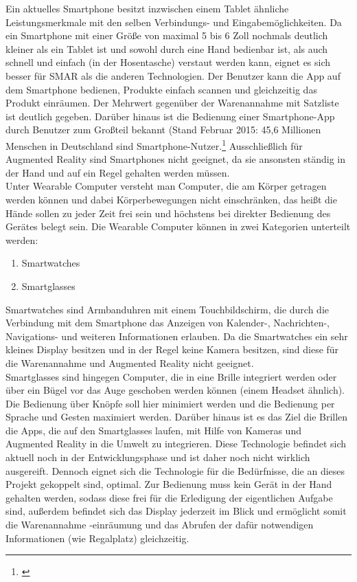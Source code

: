 Ein aktuelles Smartphone besitzt inzwischen einem Tablet ähnliche Leistungsmerkmale mit den selben Verbindungs- und Eingabemöglichkeiten. Da ein Smartphone mit einer Größe von maximal 5 bis 6 Zoll nochmals deutlich kleiner als ein Tablet ist und sowohl durch eine Hand bedienbar ist, als auch schnell und einfach (\zB in der Hosentasche) verstaut werden kann, eignet es sich besser für \ac{SMAR} als die anderen Technologien. Der Benutzer kann die App auf dem Smartphone bedienen, Produkte einfach scannen und gleichzeitig das Produkt einräumen. Der Mehrwert gegenüber der Warenannahme mit Satzliste ist deutlich gegeben. Darüber hinaus ist die Bedienung einer Smartphone-App durch Benutzer zum Großteil bekannt (Stand Februar 2015: 45,6 Millionen Menschen in Deutschland sind Smartphone-Nutzer.\footnote{\citep{statista_smartphone}} Ausschließlich für Augmented Reality sind Smartphones nicht geeignet, da sie ansonsten ständig in der Hand und auf ein Regel gehalten werden müssen.\\

Unter Wearable Computer versteht man Computer, die am Körper getragen werden können und dabei Körperbewegungen nicht einschränken, das heißt die Hände sollen zu jeder Zeit frei sein und höchstens bei direkter Bedienung des Gerätes belegt sein. Die Wearable Computer können in zwei Kategorien unterteilt werden:
\begin{enumerate}
	\item Smartwatches
	\item Smartglasses
\end{enumerate}
Smartwatches sind Armbanduhren mit einem Touchbildschirm, die durch die Verbindung mit dem Smartphone das Anzeigen von Kalender-, Nachrichten-, Navigations- und weiteren Informationen erlauben. Da die Smartwatches ein sehr kleines Display besitzen und in der Regel keine Kamera besitzen, sind diese für die Warenannahme und Augmented Reality nicht geeignet.\\
Smartglasses sind hingegen Computer, die in eine Brille integriert werden oder über ein Bügel vor das Auge geschoben werden können (einem Headset ähnlich). Die Bedienung über Knöpfe soll hier minimiert werden und die Bedienung per Sprache und Gesten maximiert werden. Darüber hinaus ist es das Ziel die Brillen \bzw die Apps, die auf den Smartglasses laufen, mit Hilfe von Kameras und Augmented Reality in die Umwelt zu integrieren. Diese Technologie befindet sich aktuell noch in der Entwicklungsphase und ist daher noch nicht wirklich ausgereift. Dennoch eignet sich die Technologie für die Bedürfnisse, die an dieses Projekt gekoppelt sind, optimal. Zur Bedienung muss kein Gerät in der Hand gehalten werden, sodass diese frei für die Erledigung der eigentlichen Aufgabe sind, außerdem befindet sich das Display jederzeit im Blick und ermöglicht somit die Warenannahme \bzw -einräumung und das Abrufen der dafür notwendigen Informationen (wie \zB Regalplatz) gleichzeitig.\\

